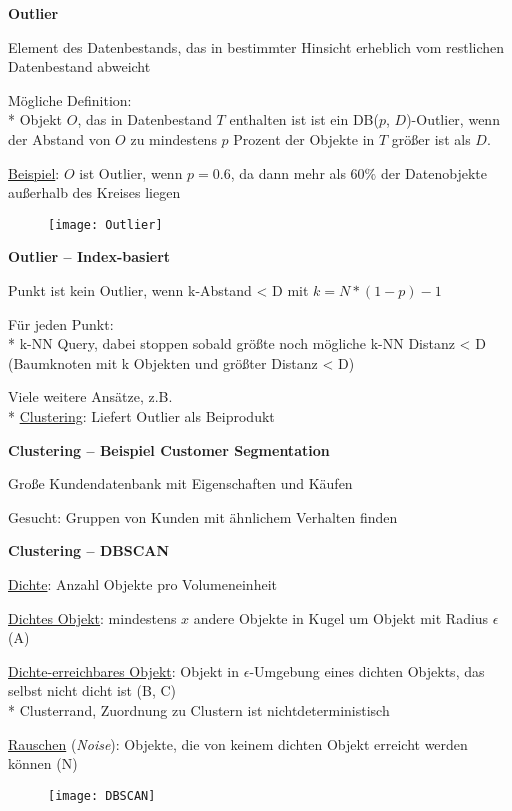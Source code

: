 \textbf{Outlier}
\begin{items}
	\item Element des Datenbestands, das in bestimmter Hinsicht erheblich vom restlichen Datenbestand abweicht
	\item Mögliche Definition: \\*
		Objekt \( O \), das in Datenbestand \( T \) enthalten ist ist ein DB(\( p \), \( D \))-Outlier, wenn der Abstand von \( O \) zu mindestens \( p \) Prozent der Objekte in \( T \) größer ist als \( D \).
	\item \underline{Beispiel}: \( O \) ist Outlier, wenn \( p=0.6 \), da dann mehr als \( 60\% \) der Datenobjekte außerhalb des Kreises liegen
\end{items}
\begin{figure}[H]\centering\label{Outlier}\texttt{[image: Outlier]}\end{figure}

\textbf{Outlier -- Index-basiert}
\begin{items}
	\item Punkt ist kein Outlier, wenn k-Abstand < D mit $k = N * (1 - p) - 1$
	\item Für jeden Punkt:\\*
		k-NN Query, dabei stoppen sobald größte noch mögliche k-NN Distanz < D  (Baumknoten mit k Objekten und größter Distanz < D)
	\item Viele weitere Ansätze, z.B. \\*
		\underline{Clustering}: Liefert Outlier als Beiprodukt
\end{items}

\newpage

\textbf{Clustering -- Beispiel Customer Segmentation}
\begin{items}
	\item Große Kundendatenbank mit Eigenschaften und Käufen
	\item Gesucht: Gruppen von Kunden mit ähnlichem Verhalten finden
\end{items}

\textbf{Clustering -- DBSCAN}
\begin{items}
	\item \underline{Dichte}: Anzahl Objekte pro Volumeneinheit
	\item \underline{Dichtes Objekt}: mindestens \( x \) andere Objekte in Kugel um Objekt mit Radius \( \epsilon \) (A)
	\item \underline{Dichte-erreichbares Objekt}: Objekt in \( \epsilon \)-Umgebung eines dichten Objekts, das selbst nicht dicht ist (B, C) \\*
		Clusterrand, Zuordnung zu Clustern ist nichtdeterministisch
	\item \underline{Rauschen} (\emph{Noise}): Objekte, die von keinem dichten Objekt erreicht werden können (N)
\end{items}
\begin{figure}[H]\centering\label{DBSCAN}\texttt{[image: DBSCAN]}\end{figure}

